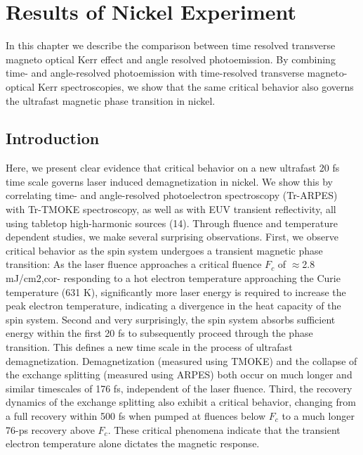 \chapter{Results of Nickel Experiment}
\label{Critical Behavior}

In this chapter we describe the comparison between time resolved transverse magneto optical Kerr effect and angle resolved photoemission. By combining time- and angle-resolved photoemission with time-resolved transverse magneto-optical Kerr spectroscopies, we show that the same critical behavior also governs the ultrafast magnetic phase transition in nickel.

\section{Introduction}

Here, we present clear evidence that critical behavior on a new ultrafast 20 fs time scale governs laser induced demagnetization in nickel. We show this by correlating time- and angle-resolved photoelectron spectroscopy (Tr-ARPES) with Tr-TMOKE spectroscopy, as well as with EUV transient reflectivity, all using tabletop high-harmonic sources (14). Through fluence and temperature dependent studies, we make several surprising observations. First, we observe critical behavior as the spin system undergoes a transient magnetic phase transition: As the laser fluence approaches a critical fluence $F_c$ of $\approx$2.8 mJ/cm2,cor- responding to a hot electron temperature approaching the Curie temperature (631 K), significantly more laser energy is required to increase the peak electron temperature, indicating a divergence in the heat capacity of the spin system. Second and very surprisingly, the spin system absorbs sufficient energy within the first 20 fs to subsequently proceed through the phase transition. This defines a new time scale in the process of ultrafast demagnetization. Demagnetization (measured using TMOKE) and the collapse of the exchange splitting (measured using ARPES) both occur on much longer and similar timescales of 176 fs, independent of the laser fluence. Third, the recovery dynamics of the exchange splitting also exhibit a critical behavior, changing from a full recovery within 500 fs when pumped at fluences below $F_c$ to a much longer 76-ps recovery above $F_c$. These critical phenomena indicate that the transient electron temperature alone dictates the magnetic response.

